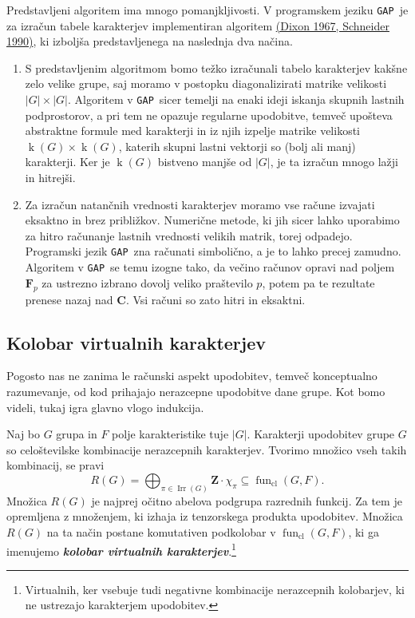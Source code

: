 \documentclass[11pt]{book}
\def\ZZ{\mathbf{Z}}
\def\CC{\mathbf{C}}
\def\FF{\mathbf{F}}
\DeclareMathOperator\Irr{Irr}
\DeclareMathOperator\kk{k}
\DeclareMathOperator\cl{cl}
\def\GAP{\texttt{GAP}}
\DeclareMathOperator\fun{fun}
\def\definicija{\color{rdeca}\bf\em}
\theoremstyle{definition}
\theoremstyle{zgled}
\theoremstyle{odprtproblem}
\theoremstyle{domacanaloga}
\theoremstyle{izrek}
\begin{document}
Predstavljeni algoritem ima mnogo pomanjkljivosti. V programskem jeziku \GAP~je za izračun tabele karakterjev implementiran algoritem \href{https://www.sciencedirect.com/science/article/pii/S0747717108800776}{(Dixon 1967, Schneider 1990)}, ki izboljša predstavljenega na naslednja dva načina.
\begin{enumerate}
    \item S predstavljenim algoritmom bomo težko izračunali tabelo karakterjev kakšne zelo velike grupe, saj moramo v postopku diagonalizirati matrike velikosti $|G| \times |G|$. Algoritem v \GAP~sicer temelji na enaki ideji iskanja skupnih lastnih podprostorov, a pri tem ne opazuje regularne upodobitve, temveč upošteva abstraktne formule med karakterji in iz njih izpelje matrike velikosti $\kk(G) \times \kk(G)$, katerih skupni lastni vektorji so (bolj ali manj) karakterji. Ker je $\kk(G)$ bistveno manjše od $|G|$, je ta izračun mnogo lažji in hitrejši.
    
    \item Za izračun natančnih vrednosti karakterjev moramo vse račune izvajati eksaktno in brez približkov. Numerične metode, ki jih sicer lahko uporabimo za hitro računanje lastnih vrednosti velikih matrik, torej odpadejo. Programski jezik \GAP~zna računati simbolično, a je to lahko precej zamudno. Algoritem v \GAP~se temu izogne tako, da večino računov opravi nad poljem $\FF_p$ za ustrezno izbrano dovolj veliko praštevilo $p$, potem pa te rezultate prenese nazaj nad $\CC$. Vsi računi so zato hitri in eksaktni.
\end{enumerate}

\subsection{Kolobar virtualnih karakterjev}

Pogosto nas ne zanima le računski aspekt upodobitev, temveč konceptualno razumevanje, od kod prihajajo nerazcepne upodobitve dane grupe. Kot bomo videli, tukaj igra glavno vlogo indukcija.

Naj bo $G$ grupa in $F$ polje karakteristike tuje $|G|$. Karakterji upodobitev grupe $G$ so celoštevilske kombinacije nerazcepnih karakterjev. Tvorimo množico vseh takih kombinacij, se pravi
\[
    R(G) = \bigoplus_{\pi \in \Irr(G)} \ZZ \cdot \chi_{\pi} \subseteq \textstyle \fun_{\cl}(G, F).
\]  
Množica $R(G)$ je najprej očitno abelova podgrupa razrednih funkcij. Za tem je opremljena z množenjem, ki izhaja iz tenzorskega produkta upodobitev. Množica $R(G)$ na ta način postane komutativen podkolobar v $\fun_{\cl}(G,F)$, ki ga imenujemo {\definicija kolobar virtualnih karakterjev}.\footnote{Virtualnih, ker vsebuje tudi negativne kombinacije nerazcepnih kolobarjev, ki ne ustrezajo karakterjem upodobitev.}
\end{document}
